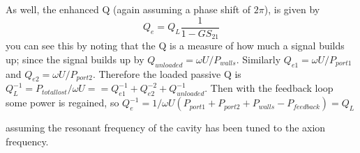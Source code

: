 \documentclass[aps,prl,twocolumn,groupedaddress]{revtex4-1}
\begin{document}
As well, the enhanced Q (again assuming a phase shift of $2\pi$), is given by \cite{ref:frenchpaper}
\begin{equation}
Q_e = Q_L\frac{1}{1-GS_{21}}
\end{equation}
you can see this by noting that the Q is a measure of how much a signal builds up; since the signal builds up by 
$Q_{unloaded} = \omega U / P_{walls}$.
Similarly
$Q_{e1} = \omega U / P_{port1}$ and $Q_{e2} = \omega U / P_{port2}$.
Therefore the loaded passive Q is $Q_L^{-1} = P_{total lost}/\omega U =  = Q_{e1}^{-1} + Q_{e2}^{-2} + Q_{unloaded}^{-1}$.
Then with the feedback loop some power is regained, so 
$Q_e^{-1} = 1/\omega U (P_{port1} + P_{port2} + P_{walls} - P_{feedback}) = Q_L$

    assuming the resonant frequency of the cavity has been tuned to the axion frequency. 
\end{document}
